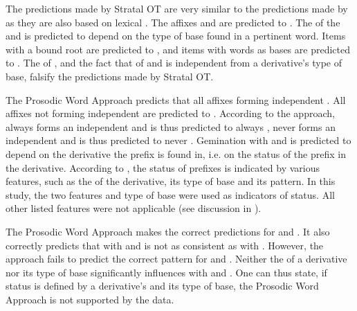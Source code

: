 The predictions made by Stratal OT are very similar to the predictions made by  as they are also based on lexical . 
The  affixes  and  are predicted to . The  of the   and  is predicted to depend on the type of base found in a pertinent word. Items with a bound root are predicted to , and items with words as bases are predicted to . The  of , and the fact that  of  and  is independent from a derivative's type of base, falsify the predictions made by Stratal OT.  

The Prosodic Word Approach predicts that all affixes forming independent  . All affixes not forming independent  are predicted to . According to the approach,  always forms an independent  and is thus predicted to always ,  never forms an independent  and is thus predicted to never . Gemination with  and  is predicted to depend on the derivative the prefix is found in, i.e. on the  status of the prefix in the  derivative. 
According to \cite{Raffelsiefen.1999}, the  status of prefixes is indicated by various features, such as the  of the derivative, its type of base and its  pattern. In this study, the two features  and type of base were used as indicators of  status. All other listed features were not applicable (see discussion in ). 

The Prosodic Word Approach  makes the correct predictions for  and . It also correctly predicts that  with  and  is not as consistent as  with . However, the approach fails to predict the correct  pattern for  and . 
 Neither the  of a derivative nor its type of base significantly influences  with  and .
One can thus state, if  status is defined by a derivative's  and its type of base, the Prosodic Word Approach is not supported by the data.


